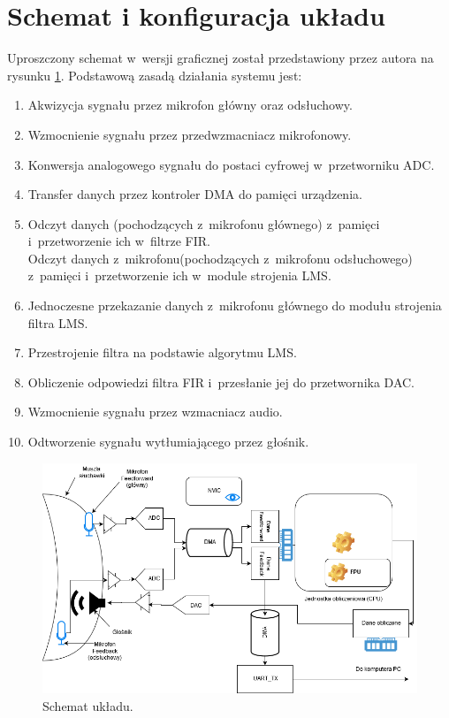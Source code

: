 \section{Schemat i konfiguracja układu}
\label{sec:config}
Uproszczony schemat w~wersji graficznej został przedstawiony przez autora na rysunku \ref{fig:schemat1}. Podstawową zasadą działania systemu jest:
\begin{enumerate}
	\item Akwizycja sygnału przez mikrofon główny oraz odsłuchowy.
	\item Wzmocnienie sygnału przez przedwzmacniacz mikrofonowy.
	\item Konwersja analogowego sygnału do postaci cyfrowej w~przetworniku ADC.
	\item Transfer danych przez kontroler DMA do pamięci urządzenia.
	\item Odczyt danych (pochodzących z~mikrofonu głównego) z~pamięci i~przetworzenie ich w~filtrze FIR.\\
	Odczyt danych z~mikrofonu(pochodzących z~mikrofonu odsłuchowego) z~pamięci i~przetworzenie ich w~module strojenia LMS.
	\item Jednoczesne przekazanie danych z~mikrofonu głównego do modułu strojenia filtra LMS.
	\item Przestrojenie filtra na podstawie algorytmu LMS.
	\item Obliczenie odpowiedzi filtra FIR i~przesłanie jej do przetwornika DAC.
	\item Wzmocnienie sygnału przez wzmacniacz audio.
	\item Odtworzenie sygnału wytłumiającego przez głośnik.
\end{enumerate}
\begin{figure}[h!]
	\includegraphics[width=\linewidth]{../Assets/schemat_ukladu.png}	
	\caption{Schemat układu.}
	\label{fig:schemat1}
\end{figure}
